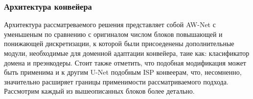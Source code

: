 \subsubsection{Архитектура конвейера}\label{sect-2-1-1}

Архитектура рассматреваемого решения представляет собой AW-Net с уменьшеным по сравнению с оригиналом числом блоков повышающей и понижающей дискретизации, к которой были присоеденены дополнительные модули, необходимые для доменной адаптации конвейера, таие как: класификатор домена и преэнкодеры. Стоит также отметить, что подобная модификация может быть применима и к другим U-Net подобным ISP конвеерам, что, несомненно, значительно расширяет границы применимости рассматриваемого подхода. Рассмотрим каждый из вышеописанных блоков более детально.

